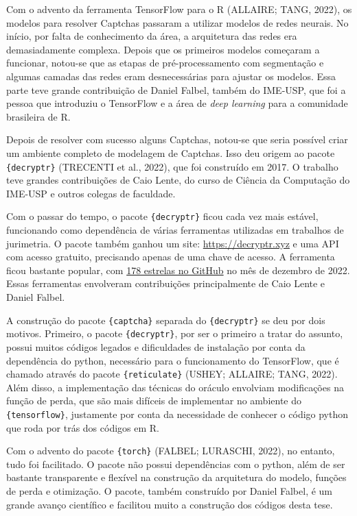 \documentclass[12pt,twoside,brazilian]{book}
\begin{document}
Com o advento da ferramenta TensorFlow para o R (ALLAIRE; TANG, 2022),
os modelos para resolver Captchas passaram a utilizar modelos de redes
neurais. No início, por falta de conhecimento da área, a arquitetura das
redes era demasiadamente complexa. Depois que os primeiros modelos
começaram a funcionar, notou-se que as etapas de pré-processamento com
segmentação e algumas camadas das redes eram desnecessárias para ajustar
os modelos. Essa parte teve grande contribuição de Daniel Falbel, também
do IME-USP, que foi a pessoa que introduziu o TensorFlow e a área de
\emph{deep learning} para a comunidade brasileira de R.

Depois de resolver com sucesso alguns Captchas, notou-se que seria
possível criar um ambiente completo de modelagem de Captchas. Isso deu
origem ao pacote \texttt{\{decryptr\}} (TRECENTI et al., 2022), que foi
construído em 2017. O trabalho teve grandes contribuições de Caio Lente,
do curso de Ciência da Computação do IME-USP e outros colegas de
faculdade.

Com o passar do tempo, o pacote \texttt{\{decryptr\}} ficou cada vez
mais estável, funcionando como dependência de várias ferramentas
utilizadas em trabalhos de jurimetria. O pacote também ganhou um site:
\url{https://decryptr.xyz} e uma API com acesso gratuito, precisando
apenas de uma chave de acesso. A ferramenta ficou bastante popular, com
\href{https://github.com/decryptr/decryptr}{178 estrelas no GitHub} no
mês de dezembro de 2022. Essas ferramentas envolveram contribuições
principalmente de Caio Lente e Daniel Falbel.

A construção do pacote \texttt{\{captcha\}} separada do
\texttt{\{decryptr\}} se deu por dois motivos. Primeiro, o pacote
\texttt{\{decryptr\}}, por ser o primeiro a tratar do assunto, possui
muitos códigos legados e dificuldades de instalação por conta da
dependência do python, necessário para o funcionamento do TensorFlow,
que é chamado através do pacote \texttt{\{reticulate\}} (USHEY; ALLAIRE;
TANG, 2022). Além disso, a implementação das técnicas do oráculo
envolviam modificações na função de perda, que são mais difíceis de
implementar no ambiente do \texttt{\{tensorflow\}}, justamente por conta
da necessidade de conhecer o código python que roda por trás dos códigos
em R.

Com o advento do pacote \texttt{\{torch\}} (FALBEL; LURASCHI, 2022), no
entanto, tudo foi facilitado. O pacote não possui dependências com o
python, além de ser bastante transparente e flexível na construção da
arquitetura do modelo, funções de perda e otimização. O pacote, também
construído por Daniel Falbel, é um grande avanço científico e facilitou
muito a construção dos códigos desta tese.
\end{document}
